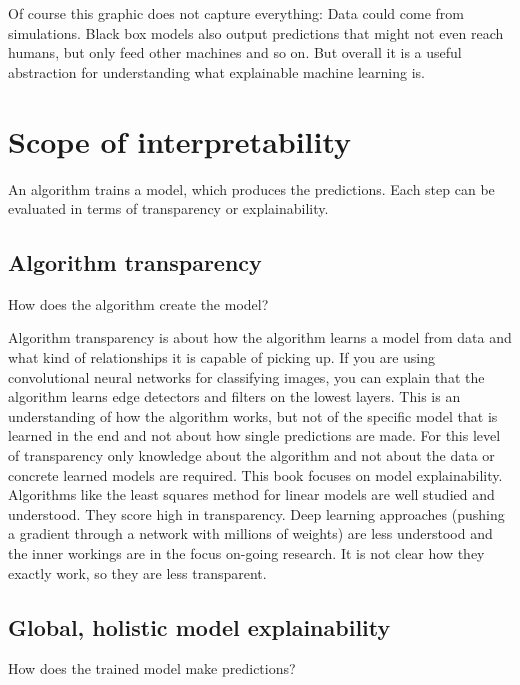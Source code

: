 \documentclass[12pt,]{krantz}
\theoremstyle{definition}
\theoremstyle{definition}
\theoremstyle{definition}
\theoremstyle{remark}
\begin{document}
Of course this graphic does not capture everything: Data could come from
simulations. Black box models also output predictions that might not
even reach humans, but only feed other machines and so on. But overall
it is a useful abstraction for understanding what explainable machine
learning is.

\section{Scope of interpretability}\label{scope-of-interpretability}

An algorithm trains a model, which produces the predictions. Each step
can be evaluated in terms of transparency or explainability.

\subsection{Algorithm transparency}\label{algorithm-transparency}

How does the algorithm create the model?

Algorithm transparency is about how the algorithm learns a model from
data and what kind of relationships it is capable of picking up. If you
are using convolutional neural networks for classifying images, you can
explain that the algorithm learns edge detectors and filters on the
lowest layers. This is an understanding of how the algorithm works, but
not of the specific model that is learned in the end and not about how
single predictions are made. For this level of transparency only
knowledge about the algorithm and not about the data or concrete learned
models are required. This book focuses on model explainability.
Algorithms like the least squares method for linear models are well
studied and understood. They score high in transparency. Deep learning
approaches (pushing a gradient through a network with millions of
weights) are less understood and the inner workings are in the focus
on-going research. It is not clear how they exactly work, so they are
less transparent.

\subsection{Global, holistic model
explainability}\label{global-holistic-model-explainability}

How does the trained model make predictions?
\end{document}
